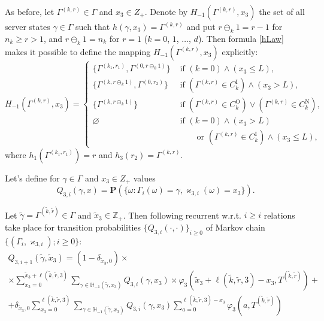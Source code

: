 \documentclass[runningheads,a4paper]{llncs}
\begin{document}
As before, let $\Gamma^{(k,r)}\in \Gamma$ and $x_3 \in Z_+$. Denote by 
$H_{-1}(\Gamma^{(k,r)}, x_3)$ the set of all server states $\gamma\in \Gamma$ such that $h(\gamma, x_3) =
\Gamma^{(k,r)}$ and put $r \ominus_k 1
= r-1$ for $n_k \geqslant r>1$, and $r \ominus_k 1 = n_k$ for $r=1$ ($k = 0$, $1$, $\ldots$, $d$).
Then formula \eqref{hLaw} makes it possible to define  the mapping $H_{-1}(\Gamma^{(k,r)}, x_3)$ explicitly:
\begin{equation}
H_{-1}(\Gamma^{(k,r)}, x_3) = 
\begin{cases}
\bigl\{\Gamma^{(k_1,r_1)}, \Gamma^{(0,r\ominus_0 1)}\bigr\}&  \text{ if  $(k=0) \wedge (x_3 \leqslant L)$,}\\
\bigl\{\Gamma^{(k,r\ominus_k 1)}, \Gamma^{(0,r_2)}\bigr\}&  \text{ if  $(\Gamma^{(k,r)}\in C_k^{\mathrm{I}})
  \wedge (x_3>L)$,}\\ 
\bigl\{\Gamma^{(k,r\ominus_k 1)}\bigr\}&  \text{ if  $(\Gamma^{(k,r)}\in C_k^{\mathrm{O}}) \vee (\Gamma^{(k,r)}\in C_k^{\mathrm{N}})$,}\\
\varnothing&  \text{ if  $(k = 0)\wedge  (x_3>L)$}\\
 & \qquad \text{ or $(\Gamma^{(k,r)}\in C_k^{\mathrm{I}}) \wedge (x_3\leqslant L)$,}
\end{cases}
\end{equation}
where $h_1(\Gamma^{(k_1,r_1)})=r$ and $h_3(r_2)=\Gamma^{(k,r)}$.

Let's define for $\gamma \in \Gamma$ and $x_3 \in Z_+$ values
\begin{equation*}
Q_{3,i}(\gamma,x) = {\mathbf P}(\{\omega\colon \Gamma_{i}(\omega)=\gamma, \varkappa_{3,i}(\omega)=x_3\}).
\end{equation*}
\begin{lemma}
Let $\tilde{\gamma} =\Gamma^{(\tilde{k},\tilde{r})}\in \Gamma$ and $\tilde{x}_3 \in {\mathbb Z}_+$. Then following recurrent w.r.t. $i\geqslant i$ relations take place for transition probabilities  $\{Q_{3,i}(\cdot,\cdot)\}_{i\geqslant 0}$ of Markov chain $\{(\Gamma_i, \varkappa_{3,i}); i \geqslant 0\}$:
\begin{multline}
Q_{3,i+1}(\tilde{\gamma},\tilde{x}_3) =(1-\delta_{\tilde{x}_3,0}) \times\\
\times \sum_{x_3=0}^{\tilde{x}_3 +  \ell(\tilde{k},\tilde{r},3)}\sum_{\gamma \in {\mathbb H}_{-1}(\tilde{\gamma},x_3)} Q_{3,i}(\gamma,x_3) \times 
\varphi_3(\tilde{x}_3 + \ell(\tilde{k},\tilde{r},3) - x_3,T^{(\tilde{k},\tilde{r})}) + \\
+ \delta_{\tilde{x}_3,0} \sum_{x_3=0}^{\ell(\tilde{k},\tilde{r},3)}\sum_{\gamma \in {\mathbb H}_{-1}(\tilde{\gamma},x_3)} Q_{3,i}(\gamma,x_3) \sum_{a=0}^{\ell(\tilde{k},\tilde{r},3) - x_3} \varphi_3(a,T^{(\tilde{k},\tilde{r})})
\label{prob:rek}
\end{multline}
\end{lemma}
\end{document}
